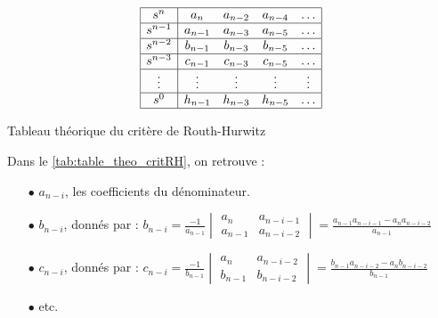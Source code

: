 \documentclass[a4paper,12pt]{article}
\begin{document}
    \begin{table}[ht]
        \centering
        \[
        \begin{array}{|c|c c c c|}
            \hline
            s^n & a_n & a_{n-2} & a_{n-4} & \dots \\
            \hline
            s^{n-1} & a_{n-1} & a_{n-3} & a_{n-5} & \dots \\
            \hline
            s^{n-2} & b_{n-1} & b_{n-3} & b_{n-5} & \dots \\
            \hline
            s^{n-3} & c_{n-1} & c_{n-3} & c_{n-5} & \dots \\
            \hline
            \vdots & \vdots & \vdots & \vdots & \vdots \\
            \hline
            s^0 & h_{n-1} & h_{n-3} & h_{n-5} & \dots \\
            \hline
        \end{array}
        \]
        \caption{Tableau théorique du critère de Routh-Hurwitz}
        \label{tab:table_theo_critRH}
    \end{table}
    
    Dans le \autoref{tab:table_theo_critRH}, on retrouve :
    \begin{itemize}
        \item[$\bullet$] $a_{n-i}$, les coefficients du dénominateur.
        \item[$\bullet$] $b_{n-i}$, donnés par :
            $b_{n-i} = \frac{-1}{a_{n-1}}
            \begin{vmatrix}
                a_n & a_{n-i-1} \\
                a_{n-1} & a_{n-i-2}
            \end{vmatrix}
            = \frac{a_{n-1} a_{n-i-1} - a_n a_{n-i-2}}{a_{n-1}}$
        \item[$\bullet$] $c_{n-i}$, donnés par :
            $c_{n-i} = \frac{-1}{b_{n-1}}
            \begin{vmatrix}
                a_n & a_{n-i-2} \\
                b_{n-1} & b_{n-i-2}
            \end{vmatrix}
            = \frac{b_{n-1} a_{n-i-2} - a_n b_{n-i-2}}{b_{n-1}}$
        \item[$\bullet$] etc.
    \end{itemize} 
    
\end{document}
